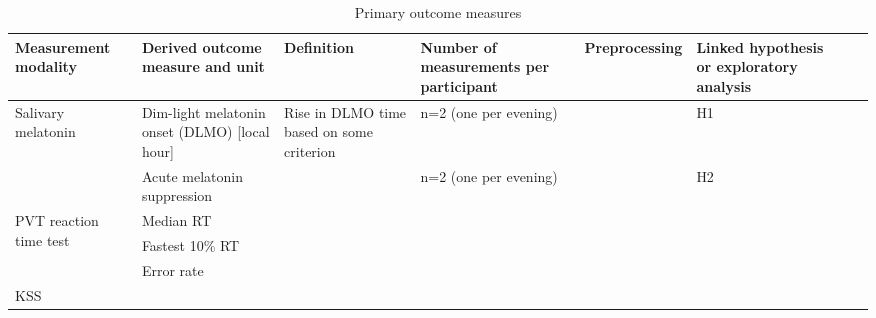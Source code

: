 \begin{landscape}
\begin{table}[h]
\centering
\caption{Primary outcome measures\label{tbl_outcomes}}
\begin{tabularx}{\linewidth}{XXXXXXXX}
\toprule
Measurement modality &
  Derived outcome measure and unit &
  Definition &
  Number of measurements per participant &
  Preprocessing &
  Linked hypothesis or exploratory analysis \\ 
\midrule
\multirow{2}{*}{Salivary melatonin} &
  Dim-light melatonin onset (DLMO) {[}local hour{]} &
  Rise in DLMO time based on some criterion &
  n=2 (one per evening) &
   &
  H1 \\
                                        & Acute melatonin suppression &  & n=2 (one per evening) &  & H2 \\
\multirow{3}{*}{PVT reaction time test} & Median RT                   &  &                       &  &    \\
                                        & Fastest 10\% RT             &  &                       &  &    \\
                                        & Error rate                  &  &                       &  &    \\
KSS                                     &                             &  &                       &  &    \\ \bottomrule
\end{tabularx}
\end{table}
\end{landscape}
